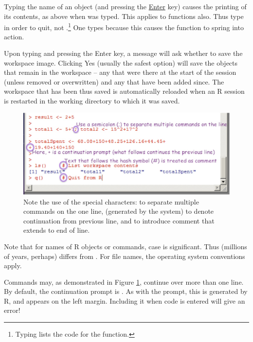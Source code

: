 Typing the name of an object (and pressing the \underline{Enter} key)
causes the printing of its contents, as above when  was
typed.  This applies to functions also. Thus type  in order
to quit, not .\footnote{Typing  lists the code for the
  function.}  One types  because this causes the function
 to spring into action.

Upon typing  and pressing the Enter key, a message will ask
whether to save the workspace image.
Clicking Yes (usually the safest
option) will save the objects that remain in the workspace -- any that
were there at the start of the session (unless removed or overwritten)
and any that have been added since.  The workspace that has been thus
saved is automatically reloaded when an R session is restarted in the
working directory to which it was saved.

\begin{figure}
\includegraphics{figs-inc/01i-cmds1.jpg}
\caption{Note the use of the special characters: \txtt{;} to separate
  multiple commands on the one line, \txtt{+} (generated by the
  system) to denote continuation from previous line, and \txtt{\#} to
  introduce comment that extends to end of line.\label{fig:cmds1}}
\end{figure}

Note that for names of R objects or commands, case is significant.
Thus  (millions of years, perhaps) differs from .
For file names, the operating system
conventions apply.

Commands may, as demonstrated in Figure \ref{fig:cmds1}, continue over
more than one line. By default, the continuation prompt is \txtt{+}.
As with the \txtt{>} prompt, this is generated by R, and appears on
the left margin.  Including it when code is entered will give an
error!  

